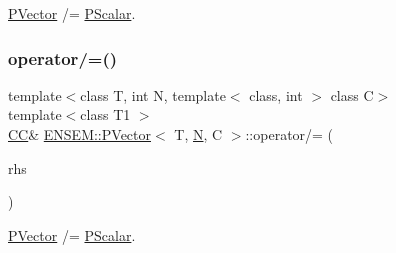 \mbox{\hyperlink{classENSEM_1_1PVector}{P\+Vector}} /= \mbox{\hyperlink{classENSEM_1_1PScalar}{P\+Scalar}}. 

\mbox{\label{classENSEM_1_1PVector_a0da5cf65327a7044128b9a36a49b94e6}} 
\subsubsection{\texorpdfstring{operator/=()}{operator/=()}\hspace{0.1cm}{\footnotesize\ttfamily [3/3]}}
{\footnotesize\ttfamily template$<$class T, int N, template$<$ class, int $>$ class C$>$ \\
template$<$class T1 $>$ \\
\mbox{\hyperlink{classENSEM_1_1PVector_a92dc0a0a301a3dc96f7be5d337019bc7}{CC}}\& \mbox{\hyperlink{classENSEM_1_1PVector}{E\+N\+S\+E\+M\+::\+P\+Vector}}$<$ T, \mbox{\hyperlink{adat__devel_2lib_2hadron_2operator__name__util_8cc_a7722c8ecbb62d99aee7ce68b1752f337}{N}}, C $>$\+::operator/= (\begin{DoxyParamCaption}\item[{const \mbox{\hyperlink{classENSEM_1_1PScalar}{P\+Scalar}}$<$ T1 $>$ \&}]{rhs }\end{DoxyParamCaption})\hspace{0.3cm}{\ttfamily [inline]}}



\mbox{\hyperlink{classENSEM_1_1PVector}{P\+Vector}} /= \mbox{\hyperlink{classENSEM_1_1PScalar}{P\+Scalar}}. 

\mbox{\label{classENSEM_1_1PVector_a2917b5cc8ed23d68b4cc6f1cfb0f9172}} 
